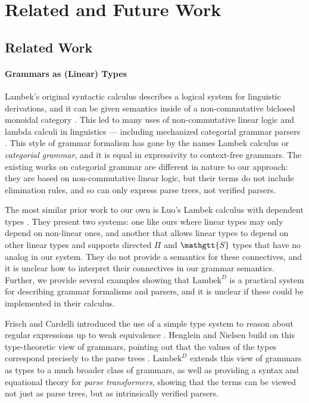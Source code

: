 \documentclass[acmsmall,nonacm]{acmart}
\renewcommand{\Sigma}{\mathgtt{S}}
\newcommand{\theoryabbv}{$\textrm{Lambek}^D$\xspace}
\begin{document}
\section{Related and Future Work}
\label{sec:discussion}

\subsection{Related Work}
\paragraph{Grammars as (Linear) Types}
Lambek's original syntactic calculus \cite{lambek58} describes a
logical system for linguistic derivations, and it can be given
semantics inside of a non-commutative biclosed monoidal category
\cite{lambek1988categorial}. This led to many uses of non-commutative
linear logic and lambda calculi in linguistics
\cite{buszkowskiTypeLogicsGrammar2003} --- including mechanized
categorial grammar parsers \cite{Guillaume2024,ranta-2011}. This style
of grammar formalism has gone by the names Lambek calculus or
\emph{categorial grammar}, and it is equal in expressivity to
context-free grammars.  The existing works on categorial grammar are
different in nature to our approach: they are based on non-commutative
linear logic, but their terms do not include elimination rules, and so
can only express parse trees, not verified parsers.

The most similar prior work to our own is Luo's Lambek calculus with
dependent types \cite{luo}. They present two systems: one like ours where linear
types may only depend on non-linear ones, and another that
allows linear types to depend on other linear types and supports
directed $\Pi$ and $\Sigma$ types that have no analog in our
system. They do not provide a semantics for these connectives, and it
is unclear how to interpret their connectives in our grammar
semantics. Further, we provide several examples showing that
\theoryabbv is a practical system for describing grammar formalisms
and parsers, and it is unclear if these could be implemented in their calculus.

Frisch and Cardelli introduced the use of a simple type system to reason about
regular expressions up to weak equivalence \cite{frischCardelli}.
Henglein and Nielsen build on this type-theoretic view of grammars, pointing out that the values of the types correspond precisely to the parse trees \cite{henglein_regular_2011}.
\theoryabbv extends this view of grammars as types to a much broader class of grammars, as well as providing a syntax and equational theory for \emph{parse transformers}, showing that the terms can be viewed not just as parse trees, but as intrinsically verified parsers.
\end{document}
